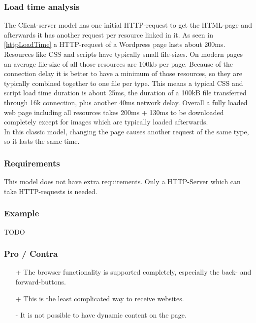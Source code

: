 \documentclass[f,bachelor,binding,twoside,palatino]{WeSTthesis}
\def \httpRequest {HTTP-request}
\def \httpRequests {HTTP-requests}
\begin{document}
    \subsubsection{Load time analysis}
      The Client-server model has one initial \httpRequest{} to get the HTML-page and afterwards it has another request per resource linked in it. 
      As seen in \ref{httpLoadTime} a \httpRequest{} of a Wordpress page lasts about 200ms.
      Resources like CSS and scripts have typically small file-sizes.
      On modern pages an average file-size of all those resources are 100kb per page. 
      Because of the connection delay it is better to have a minimum of those resources, so they are typically combined together to one file per type.
      This means a typical CSS and script load time duration is about 25ms, the duration of a 100kB file transferred through 16k connection, plus another 40ms network delay.
      Overall a fully loaded web page including all resources takes 200ms + 130ms to be downloaded completely except for images which are typically loaded afterwards.\\
      In this classic model, changing the page causes another request of the same type, so it lasts the same time.
    
    \subsubsection{Requirements}
    This model does not have extra requirements.
    Only a HTTP-Server which can take \httpRequests{} is needed.

    \subsubsection{Example}
    TODO
      
    \subsubsection{Pro / Contra}
      \begin{itemize}
  	    \item[+]{The browser functionality is supported completely, especially the back- and forward-buttons.}
  	    \item[+]{This is the least complicated way to receive websites.}
        \item[-]{It is not possible to have dynamic content on the page.}
      \end{itemize}
\end{document}
